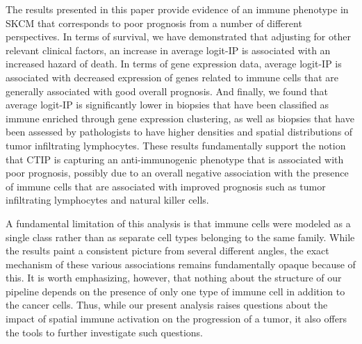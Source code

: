 \documentclass[
]{book}
\begin{document}
The results presented in this paper provide evidence
of an immune phenotype in SKCM that corresponds to poor prognosis from a number of different perspectives. In terms of survival, we have demonstrated that adjusting for other relevant clinical factors, an increase in average logit-IP is associated with an increased hazard of death. In terms of gene expression data, average logit-IP is associated with decreased expression of genes related to immune cells that are generally associated with good overall prognosis. And finally, we found that average logit-IP is significantly lower in biopsies that have been classified as immune enriched through gene expression clustering, as well as biopsies that have been assessed by pathologists to have higher densities and spatial distributions of tumor infiltrating lymphocytes. These results fundamentally support the notion that CTIP is capturing an anti-immunogenic phenotype that is associated with poor prognosis, possibly due to an overall negative association with the presence of immune cells that are associated with improved prognosis such as tumor infiltrating lymphocytes and natural killer cells.

A fundamental limitation of this analysis is that immune cells were modeled as a single class rather than as separate cell types belonging to the same family. While the results paint a consistent picture from several different angles, the exact mechanism of these various associations remains fundamentally opaque because of this. It is worth emphasizing, however, that nothing about the structure of our pipeline depends on the presence of only one type of immune cell in addition to the cancer cells. Thus, while our present analysis raises questions about the impact of spatial immune activation on the progression of a tumor, it also offers the tools to further investigate such questions.
\end{document}
